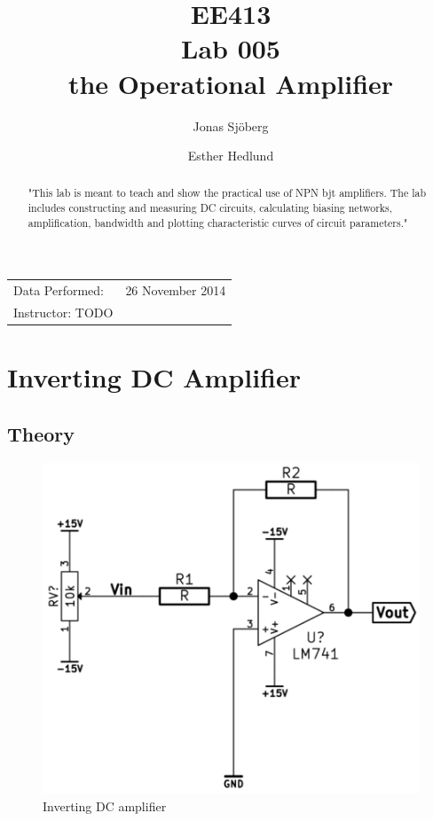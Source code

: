 \documentclass[]{article}
\title{EE413 \\ Lab 005 \\ the Operational Amplifier}
\author{{Jonas Sjöberg} \and {Esther Hedlund}}
\date{}
\begin{document}
\maketitle

\begin{center}
\begin{tabular}{l r}
Data Performed: & 26 November 2014 \\
Instructor: TODO
\end{tabular}
\end{center}

\begin{abstract}
"This lab is meant to teach and show the practical use of NPN bjt amplifiers.
The lab includes constructing and measuring DC circuits, calculating biasing networks,
amplification, bandwidth and plotting characteristic curves of circuit parameters."
\end{abstract}


\newpage


\section{Inverting DC Amplifier}\label{inverting-dc-amplifier}

\subsection{Theory}\label{theory}

\begin{figure}[htbp]
    \centering
        \includegraphics{img/invDCamp.png}
    \caption{Inverting DC amplifier}
    \label{fig:invDCamp}
\end{figure}
\end{document}
